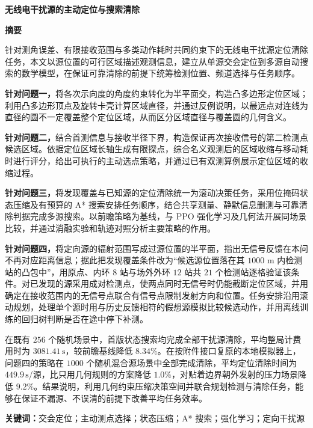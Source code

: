 \thispagestyle{empty}
\begin{center}
{\fontsize{16pt}{20pt}\selectfont\bfseries 无线电干扰源的主动定位与搜索清除\par}
\vspace{5pt}
\end{center}
\vspace{12pt}
\begin{center}
{\fontsize{14pt}{17pt}\selectfont\bfseries 摘\quad 要\par}
\end{center}
\vspace{4pt}

针对测角误差、有限接收范围与多类动作耗时共同约束下的无线电干扰源定位清除任务，本文以源位置的可行区域描述观测信息，建立从单源交会定位到多源自动搜索的数学模型，在保证可靠清除的前提下统筹检测位置、频道选择与任务顺序。

\textbf{针对问题一，}将各次示向度的角度约束转化为半平面交，构造凸多边形定位区域；利用凸多边形顶点及旋转卡壳计算区域直径，并通过反例说明，以最远点对连线为直径的圆不一定覆盖整个定位区域，从而区分区域直径与覆盖圆的几何含义。

\textbf{针对问题二，}结合首测信息与接收半径下界，构造保证再次接收信号的第二检测点候选区域。依据定位区域长轴生成有限探点，综合名义观测后的区域收缩与移动耗时进行评分，给出可执行的主动选点策略，并通过已有双测算例展示定位区域的收缩过程。

\textbf{针对问题三，}将发现覆盖与已知源的定位清除统一为滚动决策任务，采用位掩码状态压缩及有预算的 A* 搜索安排任务顺序，结合共享测量、静默信息删测与可靠清除判据完成多源搜索。以前瞻策略为基线，与 PPO 强化学习及几何法开展同场景比较，并通过消融实验和轨迹对照分析主要策略的作用。

\textbf{针对问题四，}将定向源的辐射范围写成过源位置的半平面，指出无信号反馈在本问不再对应距离信息；据此把发现覆盖条件改为“候选源位置落在其 $1000$ m 内检测站的凸包中”，用原点、内环 $8$ 站与场外外环 $12$ 站共 $21$ 个检测站逐格验证该条件。对已发现的源采用成对检测点，使两点同时无信号时仍能截断定位区域，并用确定在接收范围内的无信号点联合有信号点限制发射方向和位置。任务安排沿用滚动规划，处理单个源时用与历史反馈相符的假想源模拟比较候选动作，并用离线训练的回归树判断是否在途中停下补测。

在既有 $256$ 个随机场景中，首版状态搜索均完成全部干扰源清除，平均整局计费用时为 $3081.41\,\mathrm{s}$，较前瞻基线降低 $8.34\%$。在按附件接口复原的本地模拟器上，问题四的策略在 $1000$ 个随机混合源场景中全部完成清除，平均定位清除时间为 $449.9\,\mathrm{s}$/源，比只用几何规则的方案降低 $1.0\%$，对贴着边界朝外发射的压力场景降低 $9.2\%$。结果说明，利用几何约束压缩决策空间并联合规划检测与清除任务，能够在保证不漏源、不误清的前提下改善平均任务效率。

\vspace{12pt}
\noindent\textbf{关键词：}交会定位；主动测点选择；状态压缩；A* 搜索；强化学习；定向干扰源

